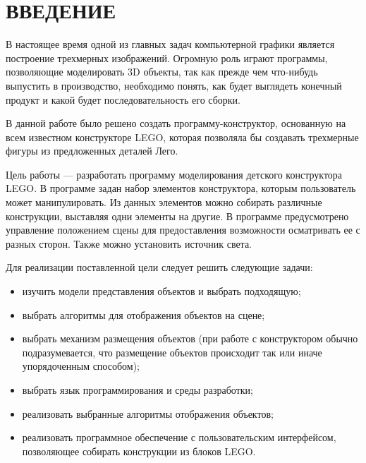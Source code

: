 \chapter*{ВВЕДЕНИЕ}

В настоящее время одной из главных задач компьютерной графики является построение трехмерных изображений. Огромную роль играют программы, позволяющие моделировать 3D объекты, так как прежде чем что-нибудь выпустить в производство, необходимо понять, как будет выглядеть конечный продукт и какой будет последовательность его сборки.

В данной работе было решено создать программу-конструктор, основанную на всем известном конструкторе LEGO, которая позволяла бы создавать трехмерные фигуры из предложенных деталей Лего.

Цель работы --- разработать программу моделирования детского конструктора LEGO. В программе задан набор элементов конструктора, которым пользователь может манипулировать. Из данных элементов можно собирать различные конструкции, выставляя одни элементы на другие. В программе предусмотрено управление положением сцены для предоставления возможности осматривать ее с разных сторон. Также можно установить источник света.

Для реализации поставленной цели следует решить следующие задачи:
\begin{itemize}[label=---]
    \item изучить модели представления объектов и выбрать подходящую;
    \item выбрать алгоритмы для отображения объектов на сцене;
    \item выбрать механизм размещения объектов (при работе с конструктором обычно подразумевается, что размещение объектов происходит так или иначе упорядоченным способом);
    \item выбрать язык программирования и среды разработки;
    \item реализовать выбранные алгоритмы отображения объектов;
    \item реализовать программное обеспечение с пользовательским интерфейсом, позволяющее собирать конструкции из блоков LEGO.
\end{itemize}